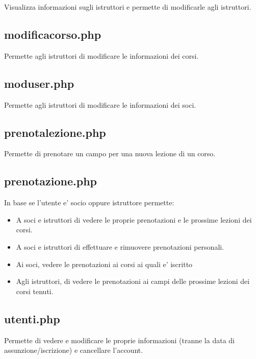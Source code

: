 Visualizza informazioni sugli istruttori e permette di modificarle agli istruttori.

\subsection{modificacorso.php}

Permette agli istruttori di modificare le informazioni dei corsi.

\subsection{moduser.php}

Permette agli istruttori di modificare le informazioni dei soci.

\subsection{prenotalezione.php}

Permette di prenotare un campo per una nuova lezione di un corso.

\subsection{prenotazione.php}

In base se l'utente e' socio oppure istruttore permette:
\begin{itemize}
\item A soci e istruttori di vedere le proprie prenotazioni e le prossime lezioni dei corsi.
\item A soci e istruttori di effettuare e rimuovere prenotazioni personali. 
\item Ai soci, vedere le prenotazioni ai corsi ai quali e' iscritto
\item Agli istruttori, di vedere le prenotazioni ai campi delle prossime lezioni dei corsi tenuti.
\end{itemize}

\subsection{utenti.php}

Permette di vedere e modificare le proprie informazioni (tranne la data di assunzione/iscrizione) e cancellare l'account.